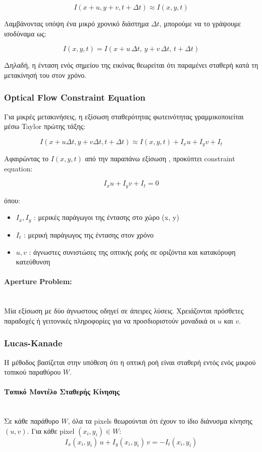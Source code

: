 \documentclass[12pt]{article}
\begin{document}
\[
I(x+u, y+v, t+\Delta t) \approx I(x, y, t)
\]

Λαμβάνοντας υπόψη ένα μικρό χρονικό διάστημα $\Delta t$, μπορούμε να το γράψουμε ισοδύναμα ως:

\[
I(x, y, t) = I(x + u \, \Delta t,\, y + v \, \Delta t,\, t + \Delta t)
\]

Δηλαδή, η ένταση ενός σημείου της εικόνας θεωρείται ότι παραμένει σταθερή κατά τη μετακίνησή του στον χρόνο.


\subsubsection{Optical Flow Constraint Equation}
Για μικρές μετακινήσεις, η εξίσωση σταθερότητας φωτεινότητας γραμμικοποιείται μέσω Taylor πρώτης τάξης:

\[
I(x+u \Delta t, y+v \Delta t, t+\Delta t) \approx I(x, y, t) + I_x u + I_y v + I_t
\]

Αφαιρώντας το \(I(x, y, t)\) από την παραπάνω εξίσωση , προκύπτει constraint equation:

\[
I_x u + I_y v + I_t = 0
\]

όπου:

\begin{itemize}
    \item \(I_x, I_y\) : μερικές παράγωγοι της έντασης στο χώρο (x, y)
    \item \(I_t\) : μερική παράγωγος της έντασης στον χρόνο
    \item \(u, v\) : άγνωστες συνιστώσες της οπτικής ροής σε οριζόντια και κατακόρυφη κατεύθυνση
\end{itemize}

\paragraph{Aperture Problem:}  
\mbox{}\\
Μία εξίσωση με δύο άγνωστους οδηγεί σε άπειρες λύσεις. Χρειάζονται πρόσθετες παραδοχές ή γειτονικές πληροφορίες για να προσδιοριστούν μοναδικά οι \(u\) και \(v\).

\subsubsection{Lucas-Kanade}
Η μέθοδος βασίζεται στην υπόθεση ότι η οπτική ροή είναι σταθερή εντός ενός μικρού τοπικού παραθύρου \(W\).

\paragraph{Τοπικό Μοντέλο Σταθερής Κίνησης}
\mbox{}\\
Σε κάθε παράθυρο \(W\), όλα τα pixels θεωρούνται ότι έχουν το ίδιο διάνυσμα κίνησης \((u,v)\).  
Για κάθε pixel \((x_i, y_i) \in W\):  
\[
I_x(x_i, y_i) \, u + I_y(x_i, y_i) \, v = - I_t(x_i, y_i)
\]  
\end{document}
